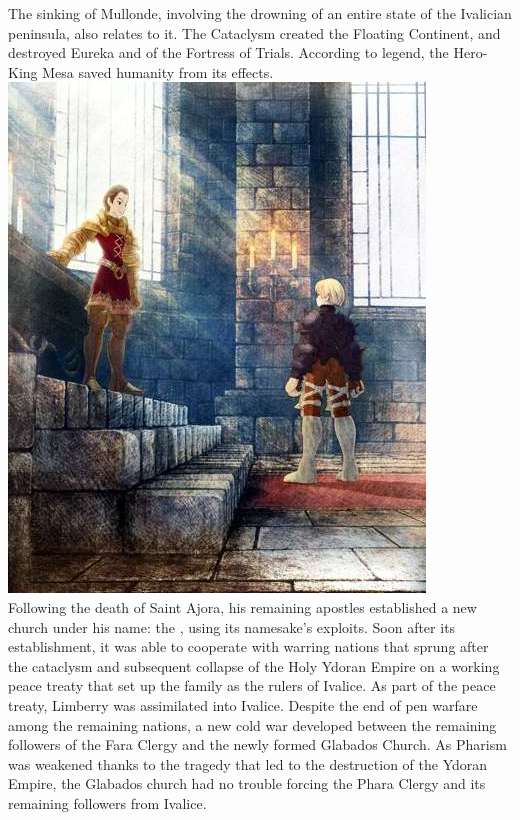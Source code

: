 The sinking of Mullonde, involving the drowning of an entire state of the Ivalician peninsula, also relates to it. 
The Cataclysm created the Floating Continent, and destroyed Eureka and of the Fortress of Trials. 
According to legend, the Hero-King Mesa saved humanity from its effects.
%
\ofpar
\includegraphics[width=\columnwidth]{./art/worldbook/delita.jpg}
\ofpar
%
\\
Following the death of Saint Ajora, his remaining apostles established a new church under his name: the , using its namesake's exploits.
Soon after its establishment, it was able to cooperate with warring nations that sprung after the cataclysm and subsequent collapse of the Holy Ydoran Empire on a working peace treaty that set up the  family as the rulers of Ivalice. 
As part of the peace treaty, Limberry was assimilated into Ivalice. 
Despite the end of pen warfare among the remaining nations, a new cold war developed between the remaining followers of the Fara Clergy and the newly formed Glabados Church.
As Pharism was weakened thanks to the tragedy that led to the destruction of the Ydoran Empire, the Glabados church had no trouble forcing the Phara Clergy and its remaining followers from Ivalice. 
